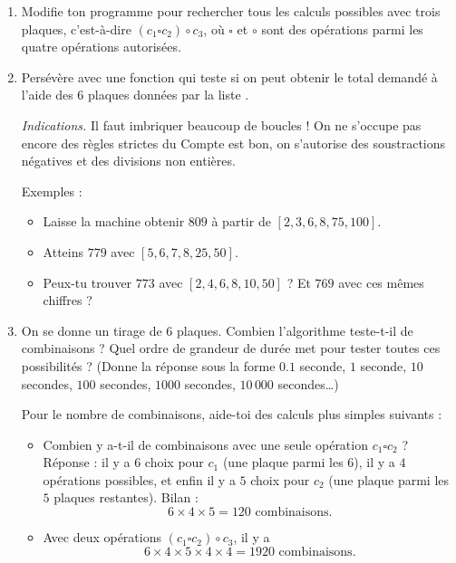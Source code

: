 \documentclass[11pt,class=report,crop=false]{standalone}
\begin{document}
\begin{activite}
\begin{enumerate}
  \item Modifie ton programme pour rechercher tous les calculs possibles avec trois plaques, c'est-à-dire $(c_1 \square c_2) \circ c_3$, où $\square$ et $\circ$ sont des opérations parmi les quatre opérations autorisées.
  
  \item Persévère avec une fonction  qui teste si on peut obtenir le total demandé à l'aide des $6$ plaques données par la liste .
  
\emph{Indications.} Il faut imbriquer beaucoup de boucles ! On ne s'occupe pas encore des règles strictes du \og{}Compte est bon\fg{}, on s'autorise des soustractions négatives et des divisions non entières.
  
  Exemples :
  \begin{itemize}
    \item Laisse la machine obtenir $809$ à partir de $[2, 3, 6, 8, 75, 100]$.
    \item Atteins $779$ avec $[5, 6, 7, 8, 25, 50]$.
    \item Peux-tu trouver $773$ avec $[2, 4, 6, 8, 10, 50]$ ? Et $769$ avec ces mêmes chiffres ?
    
  \end{itemize}
  
  \item On se donne un tirage de $6$ plaques. Combien l'algorithme teste-t-il de combinaisons ? Quel ordre de grandeur de durée met \Python{} pour tester toutes ces possibilités ? (Donne la réponse sous la forme $0.1$ seconde, $1$ seconde, $10$ secondes, $100$ secondes, $1000$ secondes, $10\,000$ secondes\ldots)
  
  Pour le nombre de combinaisons, aide-toi des calculs plus simples suivants :
  \begin{itemize}
    \item Combien y a-t-il de combinaisons avec une seule opération $c_1 \square c_2$ ? Réponse : il y a $6$ choix pour $c_1$ (une plaque parmi les $6$), il y a $4$ opérations possibles, et enfin il y a $5$ choix pour $c_2$ (une plaque parmi les $5$ plaques restantes). Bilan :
    $$6 \times 4 \times 5 = 120 \text{ combinaisons.}$$
     \item Avec deux opérations $(c_1 \square c_2) \circ c_3$, il y a 
     $$6 \times 4 \times 5 \times 4 \times 4 =  1920 \text{ combinaisons.}$$
   \end{itemize}
    
  
  
  
\end{enumerate}

\end{activite}
\end{document}
